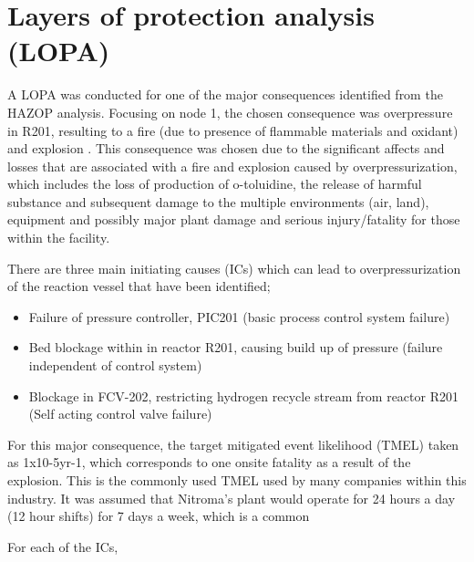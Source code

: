 \section{Layers of protection analysis (LOPA)}

A LOPA was conducted for one of the major consequences identified from the HAZOP analysis. Focusing on node 1, the chosen consequence was overpressure in R201, resulting to a fire (due to presence of flammable materials and oxidant) and explosion . This consequence was chosen due to the significant affects and losses that are associated with a fire and explosion caused by overpressurization, which includes the loss of production of o-toluidine, the release of harmful substance and subsequent damage to the multiple environments (air, land), equipment and possibly major plant damage and serious injury/fatality for those within the facility. 

There are three main initiating causes (ICs) which can lead to overpressurization of the reaction vessel that have been identified;

\begin{itemize}
\item Failure of pressure controller, PIC201 (basic process control system failure)
\item Bed blockage within in reactor R201, causing build up of pressure (failure independent of control system)
\item Blockage in FCV-202, restricting hydrogen recycle stream from reactor R201 (Self acting control valve failure)

\end{itemize}
 For this major consequence, the target mitigated event likelihood (TMEL) taken as 1x10-5yr-1, which corresponds to one onsite fatality as a result of the explosion. This is the commonly used TMEL used by many companies within this industry. It was assumed that Nitroma's plant would operate for 24 hours a day (12 hour shifts) for 7 days a week, which is a common 
 
 
 For each of the ICs, 








 